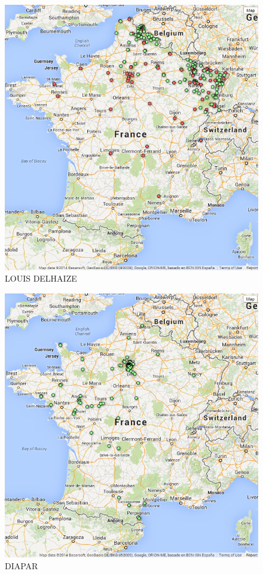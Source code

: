 \documentclass[11pt]{article}
\begin{document}
\begin{figure}[!h]
    \caption{LOUIS DELHAIZE}
	\centering
		\includegraphics[width=16cm]{images/LOUIS_DELHAIZE.png}
\end{figure}

\begin{figure}[!h]
    \caption{DIAPAR}
	\centering
		\includegraphics[width=16cm]{images/DIAPAR.png}
\end{figure}
\end{document}
